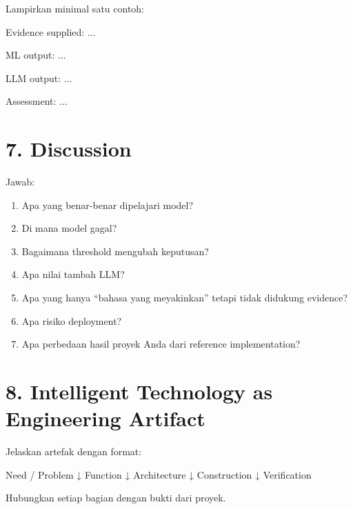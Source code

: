 \documentclass[
  indonesian,
  letterpaper,
  DIV=11,
  numbers=noendperiod]{scrreprt}
\newenvironment{Shaded}{\begin{snugshade}}{\end{snugshade}}
\newcommand{\NormalTok}[1]{\textcolor[rgb]{0.00,0.23,0.31}{#1}}
\providecommand{\tightlist}{%
  \setlength{\itemsep}{0pt}\setlength{\parskip}{0pt}}
\begin{document}
Lampirkan minimal satu contoh:

\begin{Shaded}
\begin{Highlighting}[]
\NormalTok{Evidence supplied:}
\NormalTok{...}

\NormalTok{ML output:}
\NormalTok{...}

\NormalTok{LLM output:}
\NormalTok{...}

\NormalTok{Assessment:}
\NormalTok{...}
\end{Highlighting}
\end{Shaded}

\chapter{7. Discussion}\label{discussion}

Jawab:

\begin{enumerate}
\def\labelenumi{\arabic{enumi}.}
\tightlist
\item
  Apa yang benar-benar dipelajari model?
\item
  Di mana model gagal?
\item
  Bagaimana threshold mengubah keputusan?
\item
  Apa nilai tambah LLM?
\item
  Apa yang hanya ``bahasa yang meyakinkan'' tetapi tidak didukung
  evidence?
\item
  Apa risiko deployment?
\item
  Apa perbedaan hasil proyek Anda dari reference implementation?
\end{enumerate}

\chapter{8. Intelligent Technology as Engineering
Artifact}\label{intelligent-technology-as-engineering-artifact}

Jelaskan artefak dengan format:

\begin{Shaded}
\begin{Highlighting}[]
\NormalTok{Need / Problem}
\NormalTok{    ↓}
\NormalTok{Function}
\NormalTok{    ↓}
\NormalTok{Architecture}
\NormalTok{    ↓}
\NormalTok{Construction}
\NormalTok{    ↓}
\NormalTok{Verification}
\end{Highlighting}
\end{Shaded}

Hubungkan setiap bagian dengan bukti dari proyek.
\end{document}
